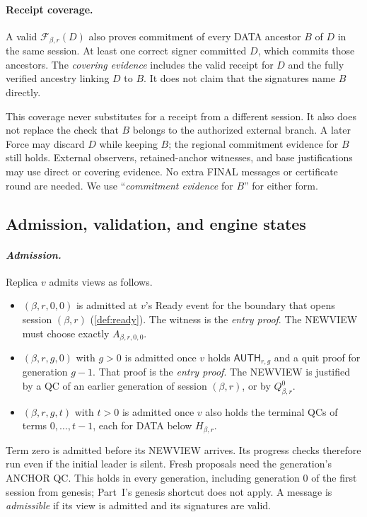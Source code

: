 \documentclass[11pt,a4paper]{article}
\newcommand{\FC}{\mathcal F}
\newcommand{\tagg}[1]{\ensuremath{\mathsf{#1}}}
\newcommand{\defterm}[1]{\textcolor{rrBlue}{\textit{#1}}}
\begin{document}
\paragraph{Receipt coverage.}
\label{sec:coverage}
A valid $\FC_{\beta,r}(D)$ also proves commitment of every DATA ancestor $B$
of $D$ in the same session. At least one correct signer committed
$D$, which commits those ancestors. The \defterm{covering evidence} includes the
valid receipt for $D$ and the fully verified ancestry linking $D$ to $B$.
It does not claim that the signatures name $B$ directly.

This coverage never substitutes for a receipt from a different session.
It also does not replace the check that $B$ belongs to the authorized
external branch. A later Force may discard $D$ while keeping $B$; the
regional commitment evidence for $B$ still holds. External observers,
retained-anchor witnesses, and base justifications may use direct or
covering evidence. No extra FINAL messages or certificate round are
needed. We use ``\defterm{commitment evidence} for $B$'' for either form.



\subsection{Admission, validation, and engine states}
\label{sec:admission}
\paragraph{\defterm{Admission.}}
Replica $v$ admits views as follows.
\begin{itemize}
\item $(\beta,r,0,0)$ is admitted at $v$'s Ready event for the boundary that
opens session $(\beta,r)$ (\cref{def:ready}). The witness is the \defterm{entry proof}.
The NEWVIEW must choose exactly $A_{\beta,r,0,0}$.
\item $(\beta,r,g,0)$ with $g>0$ is admitted once $v$ holds
$\tagg{AUTH}_{r,g}$ and a quit proof for generation $g-1$. That proof is
the \defterm{entry proof}. The NEWVIEW is justified by a QC of an earlier
generation of session $(\beta,r)$, or by $Q_{\beta,r}^0$.
\item $(\beta,r,g,t)$ with $t>0$ is admitted once $v$ also holds the terminal
QCs of terms $0,\ldots,t-1$, each for DATA below $H_{\beta,r}$.
\end{itemize}
Term zero is admitted before its NEWVIEW arrives. Its progress checks
therefore run even if the initial leader is silent. Fresh proposals need
the generation's ANCHOR QC. This holds in every generation, including
generation $0$ of the first session from genesis; Part~I's
genesis shortcut does not apply. A
message is \defterm{admissible} if its view is admitted and its signatures
are valid.
\end{document}
